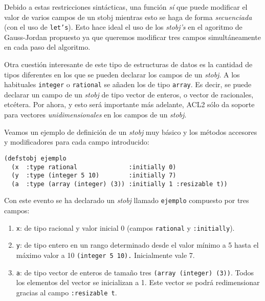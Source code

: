 \documentclass[a4paper,10pt]{article}
\begin{document}
\par \vspace{10pt}

Debido a estas restricciones sintácticas, una función \emph{sí} que puede modificar el valor de varios campos de un stobj mientras esto se haga de forma \emph{secuenciada} (con el uso de \texttt{let's}). Esto hace ideal el uso de los \emph{stobj's} en el agoritmo de Gauss-Jordan propuesto ya que queremos modificar tres campos simultáneamente en cada paso del algoritmo.

\par \vspace{10pt}

Otra cuestión interesante de este tipo de estructuras de datos es la cantidad de tipos diferentes en los que se pueden declarar los campos de un \emph{stobj}. A los habituales \texttt{integer} o \texttt{rational} se añaden los de tipo \texttt{array}. Es decir, se puede declarar un campo de un \emph{stobj} de tipo vector de enteros, o vector de racionales, etcétera. Por ahora, y esto será importante más adelante, ACL2 sólo da soporte para vectores \emph{unidimensionales} en los campos de un \emph{stobj}.

\par \vspace{10pt}

Veamos un ejemplo de definición de un \emph{stobj} muy básico y los métodos accesores y modificadores para cada campo introducido:

\par \vspace{10pt}

\begin{lstlisting}[language=clips]
(defstobj ejemplo
  (x  :type rational              :initially 0)
  (y  :type (integer 5 10)        :initially 7)
  (a  :type (array (integer) (3)) :initially 1 :resizable t))
\end{lstlisting}

\par \vspace{10pt}

Con este evento se ha declarado un \emph{stobj} llamado \texttt{ejemplo} compuesto por tres campos:

\par \vspace{10pt}

\begin{enumerate}
	\item \texttt{x}: de tipo racional y valor inicial 0 (campos \texttt{rational} y \texttt{:initially}).
	\item \texttt{y}: de tipo entero en un rango determinado desde el valor mínimo a 5 hasta el máximo valor a 10 \texttt{(integer 5 10).} Inicialmente vale 7.
	\item \texttt{a}: de tipo vector de enteros de tamaño tres \texttt{(array (integer) (3))}. Todos los elementos del vector se inicializan a 1. Este vector se podrá redimensionar gracias al campo \texttt{:resizable t}.
\end{enumerate}
\end{document}
